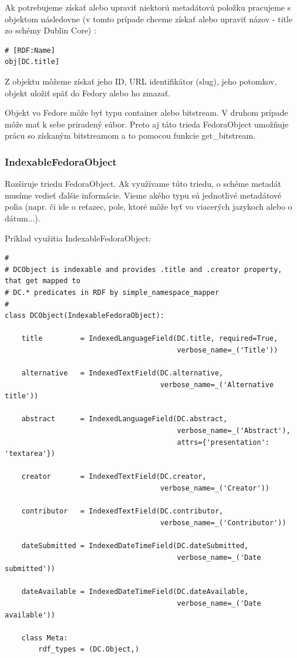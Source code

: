 \documentclass[thesis=M,slovak]{FITthesis}[2013/05/06]
\begin{document}
Ak potrebujeme získať alebo upraviť niektorú metadátovú položku pracujeme s objektom následovne (v tomto prípade chceme získať alebo upraviť názov - title zo schémy Dublin Core) : 
\begin{lstlisting}[frame=single] 
# [RDF:Name]
obj[DC.title]
\end{lstlisting}

Z objektu môžeme získať jeho ID, URL identifikátor (slug), jeho potomkov, objekt uložiť späť do Fedory alebo ho zmazať.

Objekt vo Fedore môže byť typu container alebo bitstream. V druhom prípade môže mať k sebe priradený súbor. Preto aj táto trieda FedoraObject umožňuje prácu so získaným bitstreamom a to pomocou funkcie get\_bitstream.

\subsubsection{IndexableFedoraObject}
Rozširuje triedu FedoraObject. Ak využívame túto triedu, o schéme metadát musíme vedieť ďalšie informácie. Vieme akého typu sú jednotlivé metadátové polia (napr. či ide o reťazec, pole, ktoré môže byť vo viacerých jazykoch alebo o dátum...).

Príklad využitia IndexableFedoraObject:
\begin{lstlisting}[frame=single] 
#
# DCObject is indexable and provides .title and .creator property, that get mapped to
# DC.* predicates in RDF by simple_namespace_mapper
#
class DCObject(IndexableFedoraObject):

    title         = IndexedLanguageField(DC.title, required=True,
                                         verbose_name=_('Title'))

    alternative   = IndexedTextField(DC.alternative,
                                     verbose_name=_('Alternative title'))

    abstract      = IndexedLanguageField(DC.abstract,
                                         verbose_name=_('Abstract'),
                                         attrs={'presentation': 'textarea'})

    creator       = IndexedTextField(DC.creator,
                                     verbose_name=_('Creator'))

    contributor   = IndexedTextField(DC.contributor,
                                     verbose_name=_('Contributor'))

    dateSubmitted = IndexedDateTimeField(DC.dateSubmitted,
                                         verbose_name=_('Date submitted'))

    dateAvailable = IndexedDateTimeField(DC.dateAvailable,
                                         verbose_name=_('Date available'))

    class Meta:
        rdf_types = (DC.Object,)
\end{lstlisting}
\end{document}
